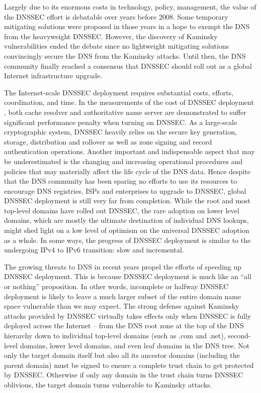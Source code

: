 \documentclass[conference]{IEEEtran}
\begin{document}
Largely due to its enormous costs in technology, policy, management, the value of the DNSSEC effort is debatable over years before 2008. Some temporary mitigating solutions were proposed in those years in a hope to exempt the DNS from the heavyweight DNSSEC. However, the discovery of Kaminsky vulnerabilities \cite{Kaminsky} ended the debate since no lightweight mitigating solutions convincingly secure the DNS from the Kaminsky attacks. Until then, the DNS community finally reached a consensus that DNSSEC should roll out as a global Internet infrastructure upgrade.


The Internet-scale DNSSEC deployment requires substantial costs, efforts, coordination, and time. In the measurements of the cost of DNSSEC deployment \cite{Performance}, both cache resolver and authoritative name server are demonstrated to suffer significant performance penalty when turning on DNSSEC. As a large-scale cryptographic system, DNSSEC heavily relies on the secure key generation, storage, distribution and rollover as well as zone signing and record authentication operations. Another important and indispensable aspect that may be underestimated is the changing and increasing operational procedures and policies that may materially affect the life cycle of the DNS data. Hence despite that the DNS community has been sparing no efforts to use its resources to encourage DNS registries, ISPs and enterprises to upgrade to DNSSEC, global DNSSEC deployment is still very far from completion. While the root and most top-level domains have rolled out DNSSEC, the rare adoption on lower level domains, which are mostly the ultimate destination of individual DNS lookups, might shed light on a low level of optimism on the universal DNSSEC adoption as a whole. In some ways, the progress of DNSSEC deployment is similar to the undergoing IPv4 to IPv6 transition: slow and incremental.


The growing threats to DNS in recent years propel the efforts of speeding up DNSSEC deployment. This is because DNSSEC deployment is much like an ``all or nothing'' proposition. In other words, incomplete or halfway DNSSEC deployment is likely to leave a much larger subset of the entire domain name space vulnerable than we may expect. The strong defense against Kaminsky attacks provided by DNSSEC virtually takes effects only when DNSSEC is fully deployed across the Internet -- from the DNS root zone at the top of the DNS hierarchy down to individual top-level domains (such as .com and .net), second-level domains, lower level domains, and even leaf domains in the DNS tree. Not only the target domain itself but also all its ancestor domains (including the parent domain) must be signed to ensure a complete trust chain to get protected by DNSSEC. Otherwise if only any domain in the trust chain turns DNSSEC oblivious, the target domain turns vulnerable to Kaminsky attacks.
\end{document}
